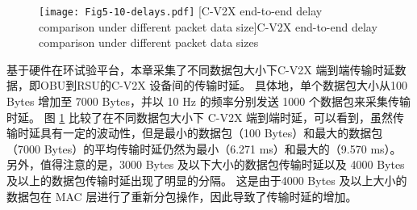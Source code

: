 \begin{figure}[h]
\centering
  \texttt{[image: Fig5-10-delays.pdf]}
  [C-V2X end-to-end delay comparison under different packet data size]{C-V2X end-to-end delay comparison under different packet data sizes}
  \label{fig 5-10}
\end{figure}

基于硬件在环试验平台，本章采集了不同数据包大小下C-V2X 端到端传输时延数据，即OBU到RSU的C-V2X 设备间的传输时延。
具体地，单个数据包大小从100 Bytes 增加至 7000 Bytes，并以 10 Hz 的频率分别发送 1000 个数据包来采集传输时延。
图 \ref{fig 5-10} 比较了在不同数据包大小下 C-V2X 端到端时延，可以看到，虽然传输时延具有一定的波动性，但是最小的数据包（100 Bytes）和最大的数据包（7000 Bytes）的平均传输时延仍然为最小（6.271 ms）和最大的（9.570 ms）。
另外，值得注意的是，3000 Bytes 及以下大小的数据包传输时延以及 4000 Bytes 及以上的数据包传输时延出现了明显的分隔。
这是由于4000 Bytes 及以上大小的数据包在 MAC 层进行了重新分包操作，因此导致了传输时延的增加。

